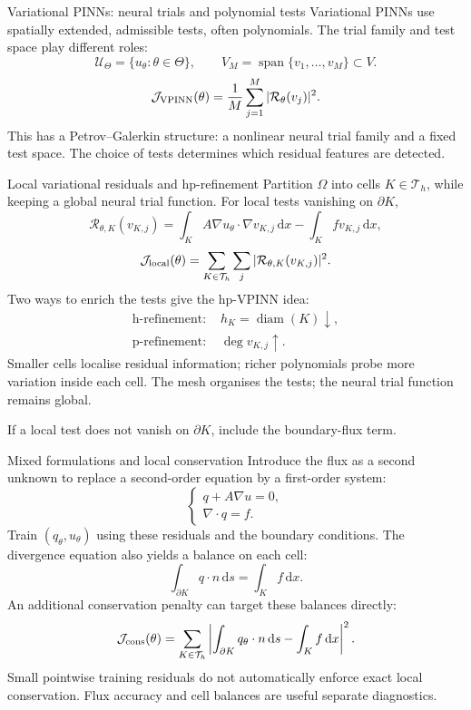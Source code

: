 \documentclass[aspectratio=43,11pt]{beamer}
\newcommand{\slideid}{L3}
\newcommand{\dd}{\,\mathrm d}
\newcommand{\U}{\mathcal{U}}
\newcommand{\Loss}{\mathcal{J}}
\newcommand{\WeakRes}{\mathcal{R}}
\DeclareMathOperator{\spanop}{span}
\newcommand{\labnote}[1]{{\scriptsize\color{courseBlue}#1\par}}
\begin{document}
\renewcommand{\slideid}{L3-S085}
\begin{frame}[c]{Variational PINNs: neural trials and polynomial tests}
\small
Variational PINNs use spatially extended, admissible tests, often
polynomials. The trial family and test space play different roles:
\[
\U_\Theta=\{u_\theta:\theta\in\Theta\},\qquad
V_M=\spanop\{v_1,\ldots,v_M\}\subset V.
\]
\[
\Loss_{\rm VPINN}(\theta)=\frac1M\sum_{j=1}^M
|\WeakRes_\theta(v_j)|^2.
\]
This has a Petrov--Galerkin structure: a nonlinear neural trial family and a
fixed test space. The choice of tests determines which residual features are detected.
\end{frame}

\renewcommand{\slideid}{L3-S087}
\begin{frame}[c]{Local variational residuals and hp-refinement}
\small
Partition $\Omega$ into cells $K\in\mathcal T_h$, while keeping a global neural
trial function. For local tests vanishing on $\partial K$,
\[
\WeakRes_{\theta,K}(v_{K,j})=\int_K A\nabla u_\theta\cdot\nabla v_{K,j}\dd x
-\int_K fv_{K,j}\dd x,
\]
\[
\Loss_{\rm local}(\theta)=\sum_{K\in\mathcal T_h}\sum_j
|\WeakRes_{\theta,K}(v_{K,j})|^2.
\]
Two ways to enrich the tests give the hp-VPINN idea:
\[
\begin{aligned}
\text{h-refinement: }&h_K=\operatorname{diam}(K)\downarrow,\\
\text{p-refinement: }&\deg v_{K,j}\uparrow.
\end{aligned}
\]
Smaller cells localise residual information; richer polynomials probe more
variation inside each cell. The mesh organises the tests; the neural trial function remains global.
\par\medskip
\labnote{If a local test does not vanish on $\partial K$, include the boundary-flux term.}
\end{frame}

\renewcommand{\slideid}{L3-S093}
\begin{frame}[c]{Mixed formulations and local conservation}
\small
Introduce the flux as a second unknown to replace a second-order equation
by a first-order system:
\[
\begin{cases}
q+A\nabla u=0,\\
\nabla\cdot q=f.
\end{cases}
\]
Train $(q_\theta,u_\theta)$ using these residuals and the boundary conditions.
The divergence equation also yields a balance on each cell:
\[
\int_{\partial K}q\cdot n\dd s=\int_K f\dd x.
\]
An additional conservation penalty can target these balances directly:
\[
\Loss_{\rm cons}(\theta)=\sum_{K\in\mathcal T_h}
\left|\int_{\partial K}q_\theta\cdot n\dd s-\int_K f\dd x\right|^2.
\]
Small pointwise training residuals do not automatically enforce exact local
conservation. Flux accuracy and cell balances are useful separate diagnostics.
\end{frame}
\end{document}
